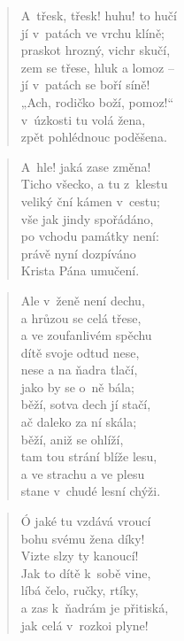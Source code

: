 \begin{verse}
A~třesk, třesk! huhu! to hučí \\
jí v~patách ve vrchu klíně; \\
praskot hrozný, vichr skučí, \\
zem se třese, hluk a lomoz -- \\
jí v~patách se boří síně! \\
„Ach, rodičko boží, pomoz!“ \\
v~úzkosti tu volá žena, \\
zpět pohlédnouc poděšena.
\end{verse}

\begin{verse}
A~hle! jaká zase změna! \\
Ticho všecko, a tu z~klestu \\
veliký ční kámen v~cestu; \\
vše jak jindy spořádáno, \\
po vchodu památky není: \\
právě nyní dozpíváno \\
Krista Pána umučení.
\end{verse}

\begin{verse}
Ale v~ženě není dechu, \\
a hrůzou se celá třese, \\
a ve zoufanlivém spěchu \\
dítě svoje odtud nese, \\
nese a na ňadra tlačí, \\
jako by se o~ně bála; \\
běží, sotva dech jí stačí, \\
ač daleko za ní skála; \\
běží, aniž se ohlíží, \\
tam tou strání blíže lesu, \\
a ve strachu a ve plesu \\
stane v~chudé lesní chýži.
\end{verse}

\begin{verse}
Ó jaké tu vzdává vroucí \\
bohu svému žena díky! \\
Vizte slzy ty kanoucí! \\
Jak to dítě k~sobě vine, \\
líbá čelo, ručky, rtíky, \\
a zas k~ňadrám je přitiská, \\
jak celá v~rozkoi plyne!
\end{verse}

